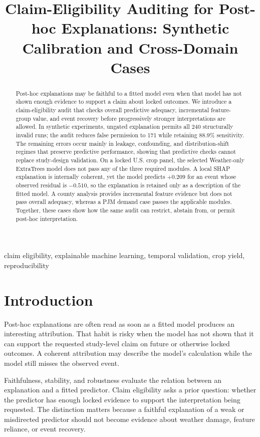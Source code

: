 \documentclass[conference]{IEEEtran}
\title{Claim-Eligibility Auditing for Post-hoc Explanations: Synthetic Calibration and Cross-Domain Cases}
\author{\IEEEauthorblockN{Anonymous Submission}}
\begin{document}
\maketitle

\begin{abstract}
Post-hoc explanations may be faithful to a fitted model even when that model has
not shown enough evidence to support a claim about locked outcomes. We introduce
a claim-eligibility audit that checks overall predictive adequacy, incremental
feature-group value, and event recovery before progressively stronger
interpretations are allowed. In synthetic experiments, ungated explanation
permits all 240 structurally invalid runs; the audit reduces false permission to
171 while retaining 88.9\% sensitivity. The remaining errors occur mainly in
leakage, confounding, and distribution-shift regimes that preserve predictive
performance, showing that predictive checks cannot replace study-design
validation. On a locked U.S. crop panel, the selected Weather-only ExtraTrees
model does not pass any of the three required modules. A local SHAP explanation
is internally coherent, yet the model predicts $+0.209$ for an event whose
observed residual is $-0.510$, so the explanation is retained only as a
description of the fitted model. A county analysis provides incremental feature
evidence but does not pass overall adequacy, whereas a PJM demand case passes
the applicable modules. Together, these cases show how the same audit can
restrict, abstain from, or permit post-hoc interpretation.
\end{abstract}

\begin{IEEEkeywords}
claim eligibility, explainable machine learning, temporal validation, crop yield,
reproducibility
\end{IEEEkeywords}

\section{Introduction}
Post-hoc explanations are often read as soon as a fitted model produces an
interesting attribution. That habit is risky when the model has not shown that it
can support the requested study-level claim on future or otherwise locked
outcomes. A coherent attribution may describe the model's calculation while the
model still misses the observed event.

Faithfulness, stability, and robustness evaluate the relation between an
explanation and a fitted predictor. Claim eligibility asks a prior question:
whether the predictor has enough locked evidence to support the interpretation
being requested. The distinction matters because a faithful explanation of a weak
or misdirected predictor should not become evidence about weather damage,
feature reliance, or event recovery.
\end{document}
